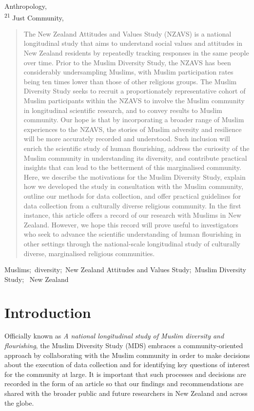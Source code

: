 \documentclass[
]{interact}
\begin{document}
Anthropology,  \\ \textsuperscript{21}  Just Community,  
\begin{abstract}
The New Zealand Attitudes and Values Study (NZAVS) is a national
longitudinal study that aims to understand social values and attitudes
in New Zealand residents by repeatedly tracking responses in the same
people over time. Prior to the Muslim Diversity Study, the NZAVS has
been considerably undersampling Muslims, with Muslim participation rates
being ten times lower than those of other religious groups. The Muslim
Diversity Study seeks to recruit a proportionately representative cohort
of Muslim participants within the NZAVS to involve the Muslim community
in longitudinal scientific research, and to convey results to Muslim
community. Our hope is that by incorporating a broader range of Muslim
experiences to the NZAVS, the stories of Muslim adversity and resilience
will be more accurately recorded and understood. Such inclusion will
enrich the scientific study of human flourishing, address the curiosity
of the Muslim community in understanding its diversity, and contribute
practical insights that can lead to the betterment of this marginalised
community. Here, we describe the motivations for the Muslim Diversity
Study, explain how we developed the study in consultation with the
Muslim community, outline our methods for data collection, and offer
practical guidelines for data collection from a culturally diverse
religious community. In the first instance, this article offers a record
of our research with Muslims in New Zealand. However, we hope this
record will prove useful to investigators who seek to advance the
scientific understanding of human flourishing in other settings through
the national-scale longitudinal study of culturally diverse,
marginalised religious communities.
\end{abstract}
\begin{keywords}
\def\sep{;\ }
Muslims\sep diversity\sep New Zealand Attitudes and Values
Study\sep Muslim Diversity Study\sep 
New Zealand
\end{keywords}


\section{Introduction}\label{sec-intro}

Officially known as \emph{A national longitudinal study of Muslim
diversity and flourishing}, the Muslim Diversity Study (MDS) embraces a
community-oriented approach by collaborating with the Muslim community
in order to make decisions about the execution of data collection and
for identifying key questions of interest for the community at large. It
is important that such processes and decisions are recorded in the form
of an article so that our findings and recommendations are shared with
the broader public and future researchers in New Zealand and across the
globe.
\end{document}
